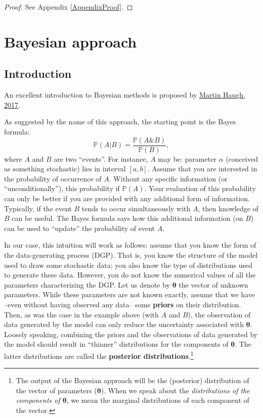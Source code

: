 \documentclass[
  12pt,
]{book}
\theoremstyle{definition}
\theoremstyle{definition}
\theoremstyle{definition}
\theoremstyle{definition}
\theoremstyle{remark}
\begin{document}
\begin{proof}
See Appendix \ref{AppendixProof}.
\end{proof}

\hypertarget{bayesian-approach}{%
\section{Bayesian approach}\label{bayesian-approach}}

\hypertarget{introduction}{%
\subsection{Introduction}\label{introduction}}

An excellent introduction to Bayesian methods is proposed by \href{http://www.columbia.edu/~mh2078/MonteCarlo/MCMC_Bayes.pdf}{Martin Haugh, 2017}.

As suggested by the name of this approach, the starting point is the Bayes formula:
\[
\mathbb{P}(A|B) = \frac{\mathbb{P}(A \& B)}{\mathbb{P}(B)},
\]
where \(A\) and \(B\) are two ``events''. For instance, \(A\) may be: parameter \(\alpha\) (conceived as something stochastic) lies in interval \([a,b]\). Assume that you are interested in the probability of occurrence of \(A\). Without any specific information (or ``unconditionally''), this probability if \(\mathbb{P}(A)\). Your evaluation of this probability can only be better if you are provided with any additional form of information. Typically, if the event \(B\) tends to occur simultaneously with \(A\), then knowledge of \(B\) can be useful. The Bayes formula says how this additional information (on \(B\)) can be used to ``update'' the probability of event \(A\).

In our case, this intuition will work as follows: assume that you know the form of the data-generating process (DGP). That is, you know the structure of the model used to draw some stochastic data; you also know the type of distributions used to generate these data. However, you do not know the numerical values of all the parameters characterizing the DGP. Let us denote by \({\boldsymbol\theta}\) the vector of unknown parameters. While these parameters are not known exactly, assume that we have --even without having observed any data-- some \textbf{priors} on their distribution. Then, as was the case in the example above (with \(A\) and \(B\)), the observation of data generated by the model can only reduce the uncertainty associated with \({\boldsymbol\theta}\). Loosely speaking, combining the priors and the observations of data generated by the model should result in ``thinner'' distributions for the components of \({\boldsymbol\theta}\). The latter distributions are called the \textbf{posterior distributions}.\footnote{The output of the Bayesian approach will be the (posterior) distribution of the vector of parameters (\(\boldsymbol\theta\)). When we speak about the \emph{distributions of the components of \({\boldsymbol\theta}\)}, we mean the marginal distributions of each component of the vector.}
\end{document}

